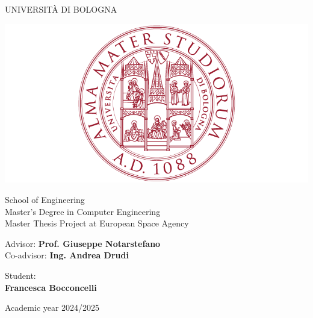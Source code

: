 \thispagestyle{empty}                                                 
\begin{center}                                                            
    \vspace{5mm}
    {\LARGE UNIVERSIT\`A DI BOLOGNA} \\                       
      \vspace{5mm}
\end{center}
\begin{center}
  \includegraphics[scale=.27]{figs/logo_unibo}
\end{center}
\begin{center}
      \vspace{5mm}
      {\LARGE School of Engineering} \\
        \vspace{3mm}
      {\Large Master's Degree in Computer Engineering} \\
      \vspace{20mm}
      {\LARGE Master Thesis Project at European Space Agency} \\
      \vspace{15mm}
\end{center}
\begin{flushleft}                                                                              
     {\large Advisor: \textbf{\@ Prof. Giuseppe Notarstefano}} \\        
     \vspace{3mm}
     {\large Co-advisor: \textbf{\@ Ing. Andrea Drudi}} \\        
     \vspace{13mm}
\end{flushleft}
\begin{flushright}
      {\large Student:}\\
      \vspace{3mm}
      \textbf{\@ Francesca Bocconcelli}
\end{flushright}        %
\begin{center}
\vfill
      {\large Academic year \@2024/2025} \\
\end{center}



\newpage
\thispagestyle{empty}
